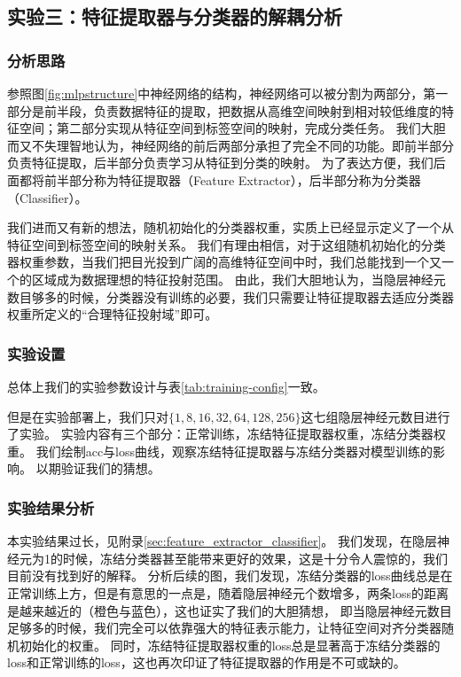 \documentclass[12pt,a4paper]{article}
\begin{document}
\subsection{实验三：特征提取器与分类器的解耦分析}
\subsubsection{分析思路}
参照图\ref{fig:mlpstructure}中神经网络的结构，神经网络可以被分割为两部分，第一部分是前半段，负责数据特征的提取，把数据从高维空间映射到相对较低维度的特征空间；第二部分实现从特征空间到标签空间的映射，完成分类任务。
我们大胆而又不失理智地认为，神经网络的前后两部分承担了完全不同的功能。即前半部分负责特征提取，后半部分负责学习从特征到分类的映射。
为了表达方便，我们后面都将前半部分称为特征提取器（Feature Extractor），后半部分称为分类器（Classifier）。

我们进而又有新的想法，随机初始化的分类器权重，实质上已经显示定义了一个从特征空间到标签空间的映射关系。
我们有理由相信，对于这组随机初始化的分类器权重参数，当我们把目光投到广阔的高维特征空间中时，我们总能找到一个又一个的区域成为数据理想的特征投射范围。
由此，我们大胆地认为，当隐层神经元数目够多的时候，分类器没有训练的必要，我们只需要让特征提取器去适应分类器权重所定义的“合理特征投射域”即可。
\subsubsection{实验设置}
总体上我们的实验参数设计与表\ref{tab:training-config}一致。

但是在实验部署上，我们只对$\{1,8,16,32,64,128,256\}$这七组隐层神经元数目进行了实验。
实验内容有三个部分：正常训练，冻结特征提取器权重，冻结分类器权重。
我们绘制acc与loss曲线，观察冻结特征提取器与冻结分类器对模型训练的影响。
以期验证我们的猜想。

\subsubsection{实验结果分析}
本实验结果过长，见附录\ref{sec:feature_extractor_classifier}。
我们发现，在隐层神经元为1的时候，冻结分类器甚至能带来更好的效果，这是十分令人震惊的，我们目前没有找到好的解释。
分析后续的图，我们发现，冻结分类器的loss曲线总是在正常训练上方，但是有意思的一点是，随着隐层神经元个数增多，两条loss的距离是越来越近的（橙色与蓝色），这也证实了我们的大胆猜想，
即当隐层神经元数目足够多的时候，我们完全可以依靠强大的特征表示能力，让特征空间对齐分类器随机初始化的权重。
同时，冻结特征提取器权重的loss总是显著高于冻结分类器的loss和正常训练的loss，这也再次印证了特征提取器的作用是不可或缺的。
\end{document}
